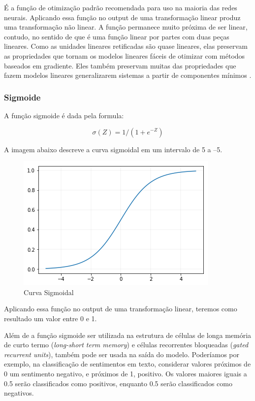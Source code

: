 \documentclass[12pt]{article}
\begin{document}
É a função de otimização padrão recomendada para uso na maioria das redes neurais. Aplicando essa função no output de uma transformação linear produz uma transformação não linear. A função permanece muito próxima de ser linear, contudo, no sentido de que é uma função linear por partes com duas peças lineares. Como as unidades lineares retificadas são quase lineares, elas preservam as propriedades que tornam os modelos lineares fáceis de otimizar com métodos baseados em gradiente. Eles também preservam muitas das propriedades que fazem modelos lineares generalizarem sistemas a partir de componentes mínimos \cite{Goodfellow-et-al-2016}.

\subsubsection{Sigmoide}

A função sigmoide é dada pela formula:

\begin{equation}
    \sigma(Z) = 1/(1+e^{-Z})
\end{equation}

A imagem abaixo descreve a curva sigmoidal em um intervalo de 5 a –5.

\begin{figure}[ht]
\centering
\includegraphics[width=.5\textwidth]{images/sigmoid.png}
\caption{Curva Sigmoidal}
\label{fig:sigmoid}
\end{figure}

Aplicando essa função no output de uma transformação linear, teremos como resultado um valor entre 0 e 1.

Além de a função sigmoide ser utilizada na estrutura de células de longa memória de curto termo (\textit{long-short term memory}) e células recorrentes bloqueadas (\textit{gated recurrent units}), também pode ser usada na saída do modelo. Poderíamos por exemplo, na classificação de sentimentos em texto, considerar valores próximos de 0 um sentimento negativo, e próximos de 1, positivo. Os valores maiores iguais a 0.5 serão classificados como positivos, enquanto 0.5 serão classificados como negativos.
\end{document}
